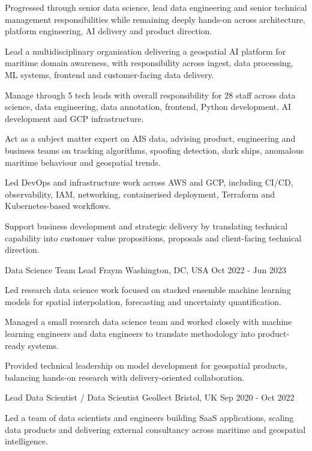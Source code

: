 \begin{cventries}
{\begin{cvitems}
      \item {Progressed through senior data science, lead data engineering and senior technical management responsibilities while remaining deeply hands-on across architecture, platform engineering, AI delivery and product direction.}
      \item {Lead a multidisciplinary organisation delivering a geospatial AI platform for maritime domain awareness, with responsibility across ingest, data processing, ML systems, frontend and customer-facing data delivery.}
      \item {Manage through 5 tech leads with overall responsibility for 28 staff across data science, data engineering, data annotation, frontend, Python development, AI development and GCP infrastructure.}
      \item {Act as a subject matter expert on AIS data, advising product, engineering and business teams on tracking algorithms, spoofing detection, dark ships, anomalous maritime behaviour and geospatial trends.}
      \item {Led DevOps and infrastructure work across AWS and GCP, including CI/CD, observability, IAM, networking, containerised deployment, Terraform and Kubernetes-based workflows.}
      \item {Support business development and strategic delivery by translating technical capability into customer value propositions, proposals and client-facing technical direction.}
    \end{cvitems}
  }
  \cventry
  {Data Science Team Lead}
  {Fraym}
  {Washington, DC, USA}
  {Oct 2022 - Jun 2023}
  {
    \begin{cvitems}
      \item {Led research data science work focused on stacked ensemble machine learning models for spatial interpolation, forecasting and uncertainty quantification.}
      \item {Managed a small research data science team and worked closely with machine learning engineers and data engineers to translate methodology into product-ready systems.}
      \item {Provided technical leadership on model development for geospatial products, balancing hands-on research with delivery-oriented collaboration.}
    \end{cvitems}
  }
  \cventry
    {Lead Data Scientist / Data Scientist}
    {Geollect}
    {Bristol, UK}
    {Sep 2020 - Oct 2022}
    {
      \begin{cvitems}
        \item {Led a team of data scientists and engineers building SaaS applications, scaling data products and delivering external consultancy across maritime and geospatial intelligence.}

\end{cvitems}}
\end{cventries}
